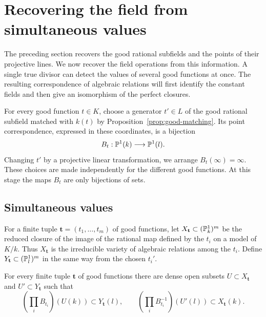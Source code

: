 \section{Recovering the field from simultaneous values}\label{sec:field}

The preceding section recovers the good rational subfields and the points of
their projective lines.  We now recover the field operations from this
information.  A single true divisor can detect the values of several good
functions at once.  The resulting correspondence of algebraic relations
will first identify the constant fields and then give an isomorphism of
the perfect closures.

For every good function \(t\in K\), choose a generator \(t'\in L\) of the good
rational subfield matched with \(k(t)\) by
Proposition~\ref{prop:good-matching}.  Its point correspondence, expressed in
these coordinates, is a bijection
\[
 B_t:\mathbb P^1(k)\longrightarrow\mathbb P^1(l).
\]
Changing \(t'\) by a projective linear transformation, we arrange
\(B_t(\infty)=\infty\).  These choices are made independently for the
different good functions.  At this stage the maps \(B_t\) are only
bijections of sets.

\subsection{Simultaneous values}

For a finite tuple \(\mathbf t=(t_1,\ldots,t_m)\) of good functions, let
\(X_{\mathbf t}\subset(\mathbb P^1_k)^m\) be the reduced closure of the image of
the rational map defined by the \(t_i\) on a model of \(K/k\).  Thus
\(X_{\mathbf t}\) is the irreducible variety of algebraic relations among
the \(t_i\).  Define \(Y_{\mathbf t}\subset(\mathbb P^1_l)^m\) in the same way
from the chosen \(t_i'\).

\begin{lemma}\label{lem:simultaneous-values}
For every finite tuple \(\mathbf t\) of good functions there are dense open
subsets \(U\subset X_{\mathbf t}\) and \(U'\subset Y_{\mathbf t}\) such that
\begin{equation}\label{eq:field-simultaneous}
 \left(\prod_i B_{t_i}\right)(U(k))\subset Y_{\mathbf t}(l),
 \qquad
 \left(\prod_i B_{t_i}^{-1}\right)(U'(l))\subset X_{\mathbf t}(k).
\end{equation}
\end{lemma}

